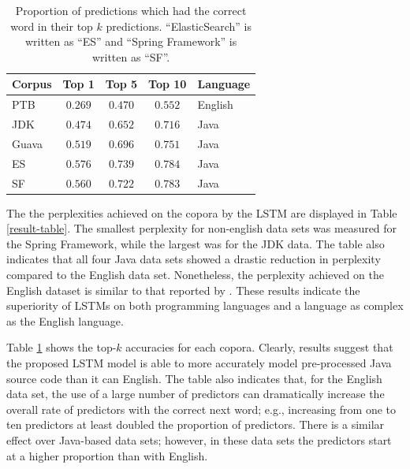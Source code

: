 \documentclass{article}
\begin{document}
\begin{table}[t]
    \caption{Proportion of predictions which had the correct
    word in their top $k$ predictions.
    ``ElasticSearch'' is written as ``ES'' and ``Spring
    Framework'' is written as ``SF''.}
    \label{topk-table}
    \vskip 0.15in
    \begin{center}
    \begin{tabular}{lcccl}
    \hline
    \abovespace\belowspace
    Corpus & Top 1 & Top 5 & Top 10 & Language \\
    \hline
    \abovespace
    PTB                 & $0.269$ & $0.470$ & $0.552$ & English \\
    JDK                 & $0.474$ & $0.652$ & $0.716$ & Java \\
    Guava               & $0.519$ & $0.696$ & $0.751$ & Java \\
    ES       & $0.576$ & $0.739$ & $0.784$ & Java \\
    \belowspace
    SF    & $0.560$ & $0.722$ & $0.783$ & Java \\
    \hline
    \end{tabular}
    \end{center}
    \vskip -0.1in
\end{table}

The the perplexities achieved on the copora by the LSTM are displayed in
Table \ref{result-table}. The smallest perplexity for non-english data sets 
was measured for the Spring Framework, while the largest was for the JDK data. 
The table also indicates that all four Java data sets showed a drastic 
reduction in perplexity compared to the English data set. Nonetheless, the 
perplexity achieved on the English dataset is similar to that reported by 
\citet{LSTMArticle}. These results indicate the superiority of LSTMs on both
programming languages and a language as complex as the English language.

Table \ref{topk-table} shows the top-$k$ accuracies for each copora.
Clearly, results suggest that the proposed LSTM model is able to more
accurately model pre-processed Java source code than it can English. The table
also indicates that, for the English data set, the use of a large number of
predictors can dramatically increase the overall rate of predictors with the
correct next word; e.g., increasing from one to ten predictors at least doubled
the proportion of predictors. There is a similar effect over Java-based data
sets; however, in these data sets the predictors start at a higher proportion
than with English.
\end{document}
